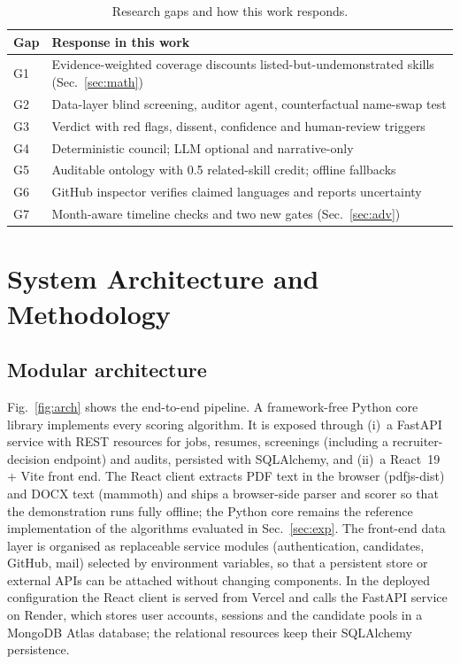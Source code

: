\documentclass[conference]{IEEEtran}
\begin{document}
\begin{table}[t]
\caption{Research gaps and how this work responds.}
\label{tab:gaps}
\centering
\footnotesize
\renewcommand{\arraystretch}{1.1}
\begin{tabular}{@{}lp{6.1cm}@{}}
\toprule
Gap & Response in this work \\
\midrule
G1 & Evidence-weighted coverage discounts listed-but-undemonstrated skills (Sec.~\ref{sec:math}) \\
G2 & Data-layer blind screening, auditor agent, counterfactual name-swap test \\
G3 & Verdict with red flags, dissent, confidence and human-review triggers \\
G4 & Deterministic council; LLM optional and narrative-only \\
G5 & Auditable ontology with 0.5 related-skill credit; offline fallbacks \\
G6 & GitHub inspector verifies claimed languages and reports uncertainty \\
G7 & Month-aware timeline checks and two new gates (Sec.~\ref{sec:adv}) \\
\bottomrule
\end{tabular}
\end{table}

\section{System Architecture and Methodology}
\label{sec:arch}

\subsection{Modular architecture}
Fig.~\ref{fig:arch} shows the end-to-end pipeline. A framework-free Python core library implements every scoring algorithm. It is exposed through (i)~a FastAPI service with REST resources for jobs, resumes, screenings (including a recruiter-decision endpoint) and audits, persisted with SQLAlchemy, and (ii)~a React~19 + Vite front end. The React client extracts PDF text in the browser (pdfjs-dist) and DOCX text (mammoth) and ships a browser-side parser and scorer so that the demonstration runs fully offline; the Python core remains the reference implementation of the algorithms evaluated in Sec.~\ref{sec:exp}. The front-end data layer is organised as replaceable service modules (authentication, candidates, GitHub, mail) selected by environment variables, so that a persistent store or external APIs can be attached without changing components. In the deployed configuration the React client is served from Vercel and calls the FastAPI service on Render, which stores user accounts, sessions and the candidate pools in a MongoDB Atlas database; the relational resources keep their SQLAlchemy persistence.
\end{document}

